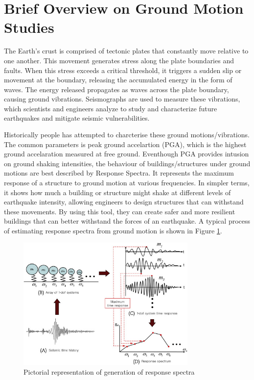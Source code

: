 \documentclass[a4paper,10pt]{article}
\begin{document}
\section{Brief Overview on Ground Motion Studies}
The Earth's crust is comprised of tectonic plates that constantly move relative to one another.
This movement generates stress along the plate boundaries and faults.
When this stress exceeds a critical threshold, it triggers a sudden slip or movement at the boundary, releasing the accumulated energy in the form of waves.
The energy released propagates as waves across the plate boundary, causing ground vibrations. 
Seismographs are used to measure these vibrations, which scientists and engineers analyze to study and characterize future earthquakes and mitigate seismic vulnerabilities. 

Historically people has attempted to charcterise these ground motions/vibrations. 
The common parameters is peak ground accelartion (PGA), which is the highest ground accelaration measured at free ground.
Eventhough PGA provides intusion on ground shaking intensities, the behaviour of buildings/structures under ground motions are best described by Response Spectra.
It represents the maximum response of a structure to ground motion at various frequencies. 
In simpler terms, it shows how much a building or structure might shake at different levels of earthquake intensity, allowing engineers to design structures that can withstand these movements. 
By using this tool, they can create safer and more resilient buildings that can better withstand the forces of an earthquake. A typical process of estimating response spectra from ground motion is shown in Figure \ref{rsp}.

\begin{figure}[ht]
\centering
\includegraphics[height=6.6cm]{gm.jpg}
\caption{Pictorial representation of generation of response spectra}
\label{rsp}
\end{figure}
\end{document}
